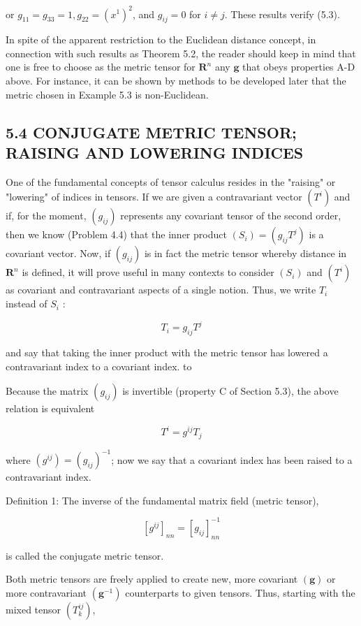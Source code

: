 \documentclass[10pt]{article}
\begin{document}
or $g_{11}=g_{33}=1, g_{22}=\left(x^{1}\right)^{2}$, and $g_{i j}=0$ for $i \neq j$. These results verify (5.3).

In spite of the apparent restriction to the Euclidean distance concept, in connection with such results as Theorem 5.2, the reader should keep in mind that one is free to choose as the metric tensor for $\mathbf{R}^{n}$ any $\mathbf{g}$ that obeys properties A-D above. For instance, it can be shown by methods to be developed later that the metric chosen in Example 5.3 is non-Euclidean.

\subsection*{5.4 CONJUGATE METRIC TENSOR; RAISING AND LOWERING INDICES}
One of the fundamental concepts of tensor calculus resides in the "raising" or "lowering" of indices in tensors. If we are given a contravariant vector $\left(T^{i}\right)$ and if, for the moment, $\left(g_{i j}\right)$ represents any covariant tensor of the second order, then we know (Problem 4.4) that the inner product $\left(S_{i}\right)=\left(g_{i j} T^{j}\right)$ is a covariant vector. Now, if $\left(g_{i j}\right)$ is in fact the metric tensor whereby distance in $\mathbf{R}^{n}$ is defined, it will prove useful in many contexts to consider $\left(S_{i}\right)$ and $\left(T^{i}\right)$ as covariant and contravariant aspects of a single notion. Thus, we write $T_{i}$ instead of $S_{i}$ :

$$
T_{i}=g_{i j} T^{j}
$$

and say that taking the inner product with the metric tensor has lowered a contravariant index to a covariant index. to

Because the matrix $\left(g_{i j}\right)$ is invertible (property $\mathrm{C}$ of Section 5.3), the above relation is equivalent

$$
T^{i}=g^{i j} T_{j}
$$

where $\left(g^{i j}\right)=\left(g_{i j}\right)^{-1}$; now we say that a covariant index has been raised to a contravariant index.

Definition 1: The inverse of the fundamental matrix field (metric tensor),

$$
\left[g^{i j}\right]_{n n}=\left[g_{i j}\right]_{n n}^{-1}
$$

is called the conjugate metric tensor.

Both metric tensors are freely applied to create new, more covariant $(\mathbf{g})$ or more contravariant $\left(\mathbf{g}^{-1}\right)$ counterparts to given tensors. Thus, starting with the mixed tensor $\left(T_{k}^{i j}\right)$,
\end{document}
